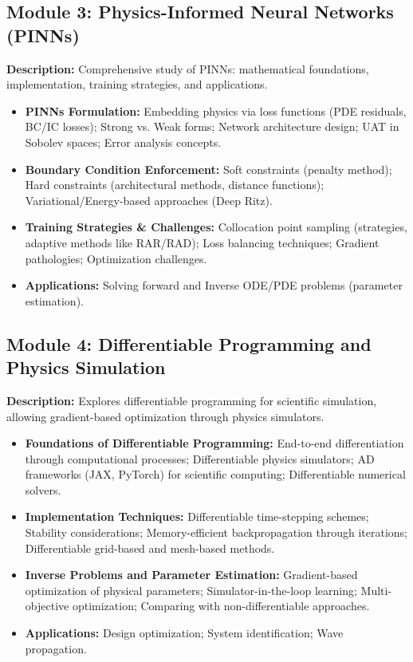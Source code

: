 \documentclass[11pt,fourier]{article}
\begin{document}
\subsection*{Module 3: Physics-Informed Neural Networks (PINNs)}
\textbf{Description:} Comprehensive study of PINNs: mathematical foundations, implementation, training strategies, and applications.
\begin{itemize}
    \item \textbf{PINNs Formulation:} Embedding physics via loss functions (PDE residuals, BC/IC losses); Strong vs. Weak forms; Network architecture design; UAT in Sobolev spaces; Error analysis concepts.
    \item \textbf{Boundary Condition Enforcement:} Soft constraints (penalty method); Hard constraints (architectural methods, distance functions); Variational/Energy-based approaches (Deep Ritz).
    \item \textbf{Training Strategies \& Challenges:} Collocation point sampling (strategies, adaptive methods like RAR/RAD); Loss balancing techniques; Gradient pathologies; Optimization challenges.
    \item \textbf{Applications:} Solving forward and Inverse ODE/PDE problems (parameter estimation).
\end{itemize}

\subsection*{Module 4: Differentiable Programming and Physics Simulation}
\textbf{Description:} Explores differentiable programming for scientific simulation, allowing gradient-based optimization through physics simulators.
\begin{itemize}
    \item \textbf{Foundations of Differentiable Programming:} End-to-end differentiation through computational processes; Differentiable physics simulators; AD frameworks (JAX, PyTorch) for scientific computing; Differentiable numerical solvers.
    
    \item \textbf{Implementation Techniques:} Differentiable time-stepping schemes; Stability considerations; Memory-efficient backpropagation through iterations; Differentiable grid-based and mesh-based methods.
    
    \item \textbf{Inverse Problems and Parameter Estimation:} Gradient-based optimization of physical parameters; Simulator-in-the-loop learning; Multi-objective optimization; Comparing with non-differentiable approaches.
    
    \item \textbf{Applications:} Design optimization; System identification; Wave propagation.
\end{itemize}
\end{document}

